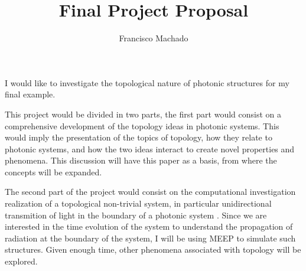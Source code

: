 \documentclass[11pt]{article}
\author{Francisco Machado}
\title{Final Project Proposal}
\begin{document}
\maketitle

I would like to investigate the topological nature of photonic structures for my final example.

This project would be divided in two parts, the first part would consist on a comprehensive development of the topology ideas in photonic systems. This would imply the presentation of the topics of topology, how they relate to photonic systems, and how the two ideas interact to create novel properties and phenomena. This discussion will have this paper \cite{Lu2014} as a basis, from where the concepts will be expanded.

The second part of the project would consist on the computational investigation realization of a topological non-trivial system, in particular unidirectional transmition of light in the boundary of a photonic system \cite{Wang2009}. Since we are interested in the time evolution of the system to understand the propagation of radiation at the boundary of the system,  I will be using MEEP to simulate such structures.  Given enough time, other phenomena associated with topology will be explored.




\end{document}
